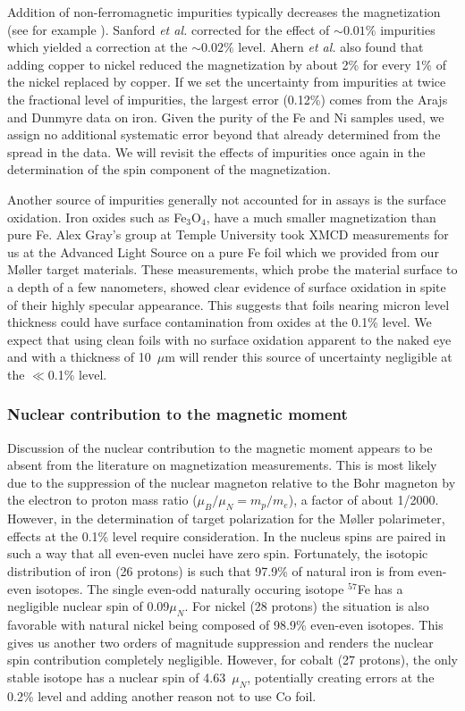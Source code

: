 \documentclass[preprint,12pt]{elsarticle}
\begin{document}
Addition of non-ferromagnetic impurities typically decreases the magnetization (see for example \cite{Luborsky1980, Ahern1958, Sanford1941}). Sanford {\it et al.} corrected for the effect of $\sim0.01\%$ impurities which yielded a correction at the $\sim0.02\%$ level\cite{Sanford1941}. Ahern {\it et al.} also found that adding copper to nickel reduced the magnetization by about 2\% for every 1\% of the nickel replaced by copper. If we set the uncertainty from impurities at twice the fractional level of impurities, the largest error (0.12\%) comes from the Arajs and Dunmyre data on iron. Given the purity of the Fe and Ni samples used, we assign no additional systematic error beyond that already determined from the spread in the data. We will revisit the effects of impurities once again in the determination of the spin component of the magnetization.

Another source of impurities generally not accounted for in assays is the surface oxidation. Iron oxides such as Fe$_3$O$_4$, have a much smaller magnetization than pure Fe. Alex Gray's group at Temple University  took XMCD measurements for us at the Advanced Light Source on a pure Fe foil which we provided from our M\o ller target materials. These measurements, which probe the material surface to a depth of a few nanometers, showed clear evidence of surface oxidation in spite of their highly specular appearance. This suggests that foils nearing micron level thickness could have surface contamination from oxides at the 0.1\% level. We expect that using clean foils with no surface oxidation apparent to the naked eye and with a thickness of 10~$\mu$m will render this source of uncertainty negligible at the $\ll$0.1\% level. 

\subsubsection{Nuclear contribution to the magnetic moment}
Discussion of the nuclear contribution to the magnetic moment appears to be absent from the literature on magnetization measurements. This is most likely due to the suppression of the nuclear magneton relative to the Bohr magneton by the electron to proton mass ratio ($\mu_B/\mu_N=m_p/m_e$), a factor of about 1/2000. However, in the determination of target polarization for the M\o ller polarimeter, effects at the 0.1\% level require consideration. In the nucleus spins are paired in such a way that all even-even nuclei have zero spin. Fortunately, the isotopic distribution of iron (26 protons) is such that 97.9\% of natural iron is from even-even isotopes. The single even-odd naturally occuring isotope $^{57}$Fe has a negligible nuclear spin of 0.09$\mu_N$\cite{Locher1965}. For nickel (28 protons) the situation is also favorable with natural nickel being composed of 98.9\% even-even isotopes. This gives us another two orders of magnitude suppression and renders the nuclear spin contribution completely negligible. However, for cobalt (27 protons), the only stable isotope has a nuclear spin of 4.63~$\mu_N$, potentially creating errors at the 0.2\% level and adding another reason not to use Co foil.   
\end{document}

